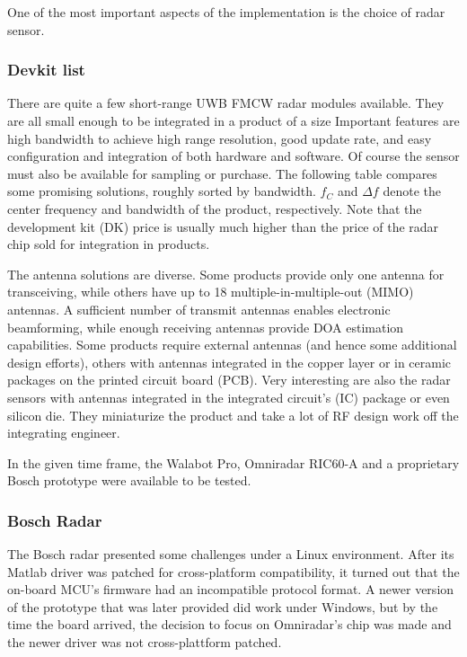 One of the most important aspects of the implementation is the choice of radar sensor.

\subsubsection{Devkit list}\label{devkit-list}

There are quite a few short-range UWB FMCW radar modules available. They are all small enough to be integrated in a product of a size Important features are high bandwidth to achieve high range resolution, good update rate, and easy configuration and integration of both hardware and software. Of course the sensor must also be available for sampling or purchase. The following table compares some promising solutions, roughly sorted by bandwidth. $f_C$ and $\Delta f$ denote the center frequency and bandwidth of the product, respectively. Note that the development kit (DK) price is usually much higher than the price of the radar chip sold for integration in products.



The antenna solutions are diverse. Some products provide only one antenna for transceiving, while others have up to 18 multiple-in-multiple-out (MIMO) antennas. A sufficient number of transmit antennas enables electronic beamforming, while enough receiving antennas provide DOA estimation capabilities. Some products require external antennas (and hence some additional design efforts), others with antennas integrated in the copper layer or in ceramic packages on the printed circuit board (PCB). Very interesting are also the radar sensors with antennas integrated in the integrated circuit's (IC) package or even silicon die. They miniaturize the product and take a lot of RF design work off the integrating engineer.

In the given time frame, the Walabot Pro, Omniradar RIC60-A and a proprietary Bosch prototype were available to be tested.

\subsubsection{Bosch Radar}\label{bosch-radar}

The Bosch radar presented some challenges under a Linux environment. After its Matlab driver was patched for cross-platform compatibility, it turned out that the on-board MCU's firmware had an incompatible protocol format. A newer version of the prototype that was later provided did work under Windows, but by the time the board arrived, the decision to focus on Omniradar's chip was made and the newer driver was not cross-plattform patched.

